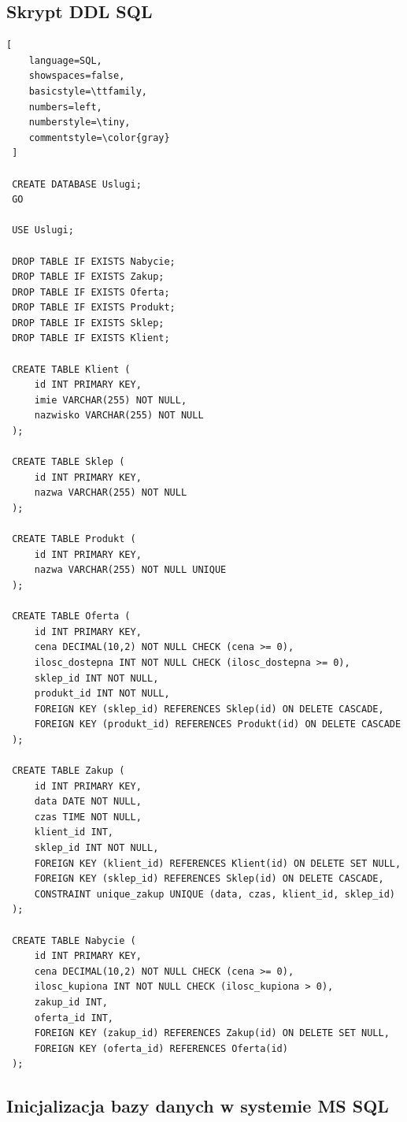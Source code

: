 \documentclass[a4paper,12pt]{article}
\begin{document}
\subsection{Skrypt DDL SQL}

\begin{lstlisting}[
    language=SQL,
    showspaces=false,
    basicstyle=\ttfamily,
    numbers=left,
    numberstyle=\tiny,
    commentstyle=\color{gray}
 ]

 CREATE DATABASE Uslugi;
 GO
 
 USE Uslugi;
 
 DROP TABLE IF EXISTS Nabycie;
 DROP TABLE IF EXISTS Zakup;
 DROP TABLE IF EXISTS Oferta;
 DROP TABLE IF EXISTS Produkt;
 DROP TABLE IF EXISTS Sklep;
 DROP TABLE IF EXISTS Klient;
 
 CREATE TABLE Klient (
     id INT PRIMARY KEY,
     imie VARCHAR(255) NOT NULL,
     nazwisko VARCHAR(255) NOT NULL
 );
 
 CREATE TABLE Sklep (
     id INT PRIMARY KEY,
     nazwa VARCHAR(255) NOT NULL
 );
 
 CREATE TABLE Produkt (
     id INT PRIMARY KEY,
     nazwa VARCHAR(255) NOT NULL UNIQUE
 );
 
 CREATE TABLE Oferta (
     id INT PRIMARY KEY,
     cena DECIMAL(10,2) NOT NULL CHECK (cena >= 0),
     ilosc_dostepna INT NOT NULL CHECK (ilosc_dostepna >= 0),
     sklep_id INT NOT NULL,
     produkt_id INT NOT NULL,
     FOREIGN KEY (sklep_id) REFERENCES Sklep(id) ON DELETE CASCADE,
     FOREIGN KEY (produkt_id) REFERENCES Produkt(id) ON DELETE CASCADE
 );
 
 CREATE TABLE Zakup (
     id INT PRIMARY KEY,
     data DATE NOT NULL,
     czas TIME NOT NULL,
     klient_id INT,
     sklep_id INT NOT NULL,
     FOREIGN KEY (klient_id) REFERENCES Klient(id) ON DELETE SET NULL,
     FOREIGN KEY (sklep_id) REFERENCES Sklep(id) ON DELETE CASCADE,
     CONSTRAINT unique_zakup UNIQUE (data, czas, klient_id, sklep_id)
 );
 
 CREATE TABLE Nabycie (
     id INT PRIMARY KEY,
     cena DECIMAL(10,2) NOT NULL CHECK (cena >= 0),
     ilosc_kupiona INT NOT NULL CHECK (ilosc_kupiona > 0),
     zakup_id INT,
     oferta_id INT,
     FOREIGN KEY (zakup_id) REFERENCES Zakup(id) ON DELETE SET NULL,
     FOREIGN KEY (oferta_id) REFERENCES Oferta(id)
 ); 

\end{lstlisting}

\subsection{Inicjalizacja bazy danych w systemie MS SQL}
\end{document}
